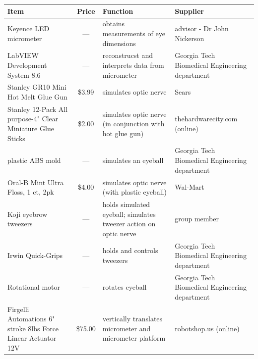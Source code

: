 \documentclass{article}
\begin{document}
\begin{table}[H]
  \centering
  \begin{tabularx}{\textwidth}{XcXX}
    \toprule
    \textbf{Item} & \textbf{Price} & \textbf{Function} & \textbf{Supplier} \\
    \hline
    Keyence LED micrometer                                          & ---      & obtains measurements of eye dimensions                            & advisor - Dr John Nickerson                    \\
    LabVIEW Development System 8.6                                  & ---      & reconstrucst and interprets data from micrometer                  & Georgia Tech Biomedical Engineering department \\
    Stanley GR10 Mini Hot Melt Glue Gun                             & \$3.99   & simulates optic nerve                                             & Sears                                          \\
    Stanley 12-Pack All purpose-4" Clear Miniature Glue Sticks      & \$2.00   & simulates optic nerve (in conjunction with hot glue gun)          & thehardwarecity.com (online)                   \\
    plastic ABS mold                                                & ---      & simulates an eyeball                                              & Georgia Tech Biomedical Engineering department \\
    Oral-B Mint Ultra Floss, 1 ct, 2pk                              & \$4.00   & simulates optic nerve (with plastic eyeball)                      & Wal-Mart                                       \\
    Koji eyebrow tweezers                                           & ---      & holds simulated eyeball; simulates tweezer action on optic nerve  & group member                                   \\
    Irwin Quick-Grips                                               & ---      & holds and controls tweezers                                       & Georgia Tech Biomedical Engineering department \\
    Rotational motor                                                & ---      & rotates eyeball                                                   & Georgia Tech Biomedical Engineering department \\
    Firgelli Automations 6" stroke 8lbs Force Linear Actuator 12V   & \$75.00  & vertically translates micrometer and micrometer platform          & robotshop.us (online)                          \\

\end{tabularx}
\end{table}
\end{document}
